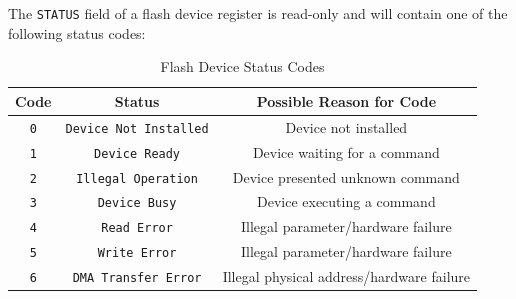 \documentclass[12pt,a4paper,openright,twoside]{report}
\begin{document}
The \texttt{STATUS} field of a flash device register is read-only and will contain one of the following status codes:
\begin{table}[h]
	\centering
	\begin{tabular}{c|c|c}
		Code       & Status                        & Possible Reason for Code                  \\  \hline\hline
		\texttt{0} & \texttt{Device Not Installed} & Device not installed                      \\ \hline
		\texttt{1} & \texttt{Device Ready}         & Device waiting for a command              \\ \hline
		\texttt{2} & \texttt{Illegal Operation}    & Device presented unknown command          \\ \hline
		\texttt{3} & \texttt{Device Busy}          & Device executing a command                \\ \hline
		\texttt{4} & \texttt{Read Error}           & Illegal parameter/hardware failure        \\ \hline
		\texttt{5} & \texttt{Write Error}          & Illegal parameter/hardware failure        \\ \hline
		\texttt{6} & \texttt{DMA Transfer Error}   & Illegal physical address/hardware failure
	\end{tabular}
	\caption{Flash Device Status Codes}
\end{table}
\end{document}
